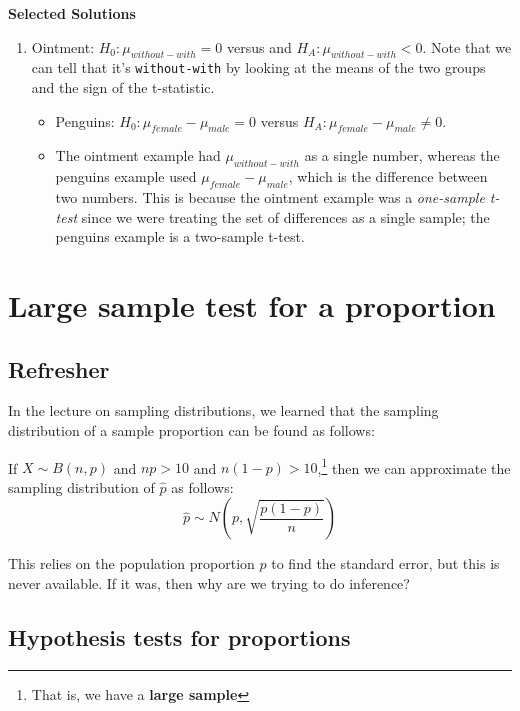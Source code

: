 \documentclass[
  letterpaper,
  DIV=11,
  numbers=noendperiod,
  oneside]{scrreprt}
\providecommand{\tightlist}{%
  \setlength{\itemsep}{0pt}\setlength{\parskip}{0pt}}\usepackage{longtable,booktabs,array}
\begin{document}
\textbf{Selected Solutions}

\begin{enumerate}
\def\labelenumi{\arabic{enumi}.}
\tightlist
\item
  Ointment: \(H_0: \mu_{without-with} = 0\) versus and
  \(H_A: \mu_{without-with} < 0\). Note that we can tell that it's
  \texttt{without-with} by looking at the means of the two groups and
  the sign of the t-statistic.

  \begin{itemize}
  \tightlist
  \item
    Penguins: \(H_0: \mu_{female} - \mu_{male} = 0\) versus
    \(H_A: \mu_{female} - \mu_{male} \ne 0\).
  \item
    The ointment example had \(\mu_{without - with}\) as a single
    number, whereas the penguins example used
    \(\mu_{female} - \mu_{male}\), which is the difference between two
    numbers. This is because the ointment example was a \emph{one-sample
    t-test} since we were treating the set of differences as a single
    sample; the penguins example is a two-sample t-test.
  \end{itemize}
\end{enumerate}

\hypertarget{large-sample-test-for-a-proportion}{%
\chapter{Large sample test for a
proportion}\label{large-sample-test-for-a-proportion}}

\hypertarget{refresher}{%
\section{Refresher}\label{refresher}}

In the lecture on sampling distributions, we learned that the sampling
distribution of a sample proportion can be found as follows:

If \(X\sim B(n,p)\) and \(np>10\) and \(n(1-p)>10\),\footnote{That is,
  we have a \textbf{large sample}} then we can approximate the sampling
distribution of \(\hat p\) as follows: \[
\hat p \sim N\left(p, \sqrt{\frac{p(1-p)}{n}}\right)
\]

This relies on the population proportion \(p\) to find the standard
error, but this is never available. If it was, then why are we trying to
do inference?

\hypertarget{hypothesis-tests-for-proportions}{%
\section{Hypothesis tests for
proportions}\label{hypothesis-tests-for-proportions}}
\end{document}
